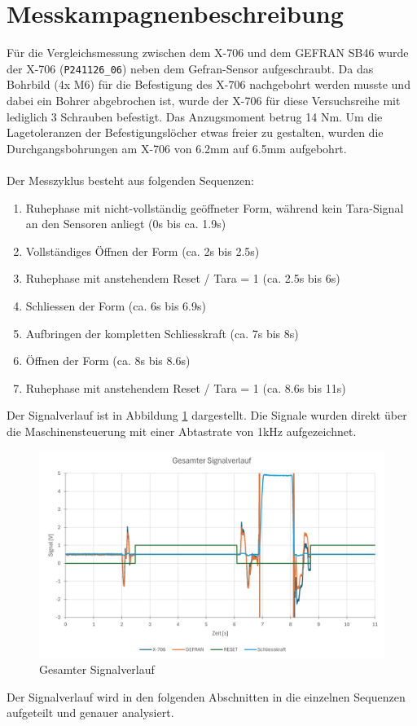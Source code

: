 \documentclass[12pt,a4paper]{article}
\begin{document}
\section{Messkampagnenbeschreibung}
Für die Vergleichsmessung zwischen dem X-706 und dem GEFRAN SB46 wurde der X-706 (\texttt{P241126\_06}) neben dem Gefran-Sensor aufgeschraubt. Da das Bohrbild (4x M6) für die Befestigung des X-706 nachgebohrt werden musste und dabei ein Bohrer abgebrochen ist, wurde der X-706 für diese Versuchsreihe mit lediglich 3 Schrauben befestigt. Das Anzugsmoment betrug 14 Nm. Um die Lagetoleranzen der Befestigungslöcher etwas freier zu gestalten, wurden die Durchgangsbohrungen am X-706 von 6.2mm auf 6.5mm aufgebohrt.\\
\\
Der Messzyklus besteht aus folgenden Sequenzen:
\begin{enumerate}
	\item \label{it:opentara}Ruhephase mit nicht-vollständig geöffneter Form, während kein Tara-Signal an den Sensoren anliegt (0s bis ca. 1.9s)
	\item Vollständiges Öffnen der Form (ca. 2s bis 2.5s)
	\item Ruhephase mit anstehendem Reset / Tara = 1 (ca. 2.5s bis 6s)
	\item Schliessen der Form (ca. 6s bis 6.9s)
	\item Aufbringen der kompletten Schliesskraft (ca. 7s bis 8s)
	\item Öffnen der Form (ca. 8s bis 8.6s)
	\item Ruhephase  mit anstehendem Reset / Tara = 1 (ca. 8.6s bis 11s)
\end{enumerate} 
Der Signalverlauf ist in Abbildung \ref{fig:gesamtverlauf} dargestellt. Die Signale wurden direkt über die Maschinensteuerung mit einer Abtastrate von 1kHz aufgezeichnet.
\begin{figure}[H]
	\centering
	\includegraphics[width=1\linewidth]{imgs/Gesamtverlauf}
	\caption{Gesamter Signalverlauf}
	\label{fig:gesamtverlauf}
\end{figure}\noindent
Der Signalverlauf wird in den folgenden Abschnitten in die einzelnen Sequenzen aufgeteilt und genauer analysiert.
\end{document}
